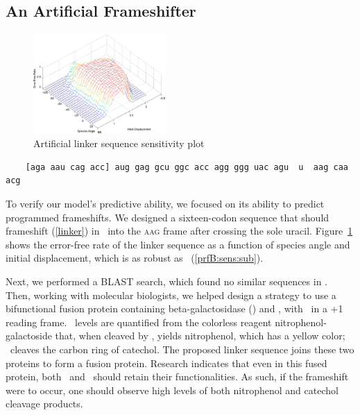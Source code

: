\documentclass[12pt]{article}
\begin{document}
\subsection{An Artificial Frameshifter}
\label{section:linker}
\begin{figure}
  \centering
  \caption{Artificial linker sequence sensitivity plot}
  \label{linker:sens}
  \includegraphics[width=0.45\textwidth]{linker/sensitivity}
\end{figure}

\begin{cfigure}
  \caption{Artificial linker sequence with a 12-base leader sequence
    in brackets}
  \label{linker}
  \begin{verbatim}
    [aga aau cag acc] aug gag gcu ggc acc agg ggg uac agu  u  aag caa acg
  \end{verbatim}
\end{cfigure}

To verify our model's predictive ability, we focused on its ability to
predict programmed frameshifts. We designed a sixteen-codon sequence
that should frameshift (\autoref{linker}) in \ecoli\ into
the \textsc{aag} frame after crossing the sole uracil.  Figure~\ref{linker:sens}
shows the error-free rate of the linker sequence as a function of species
angle and initial displacement, which is as robust as \prfB\ (\autoref{prfB:sens:sub}).

Next, we performed a BLAST search, which found no similar sequences in 
\ecoli. Then, working with molecular 
biologists, we helped design a strategy to use a bifunctional fusion 
protein containing beta-galactosidase (\bgals) and \xylE, with \xylE\ in 
a +1 reading frame. \bgals\ levels are quantified from the colorless 
reagent nitrophenol-galactoside that, when cleaved by \bgals, yields 
nitrophenol, which has a yellow color; \xylE\ cleaves the carbon ring 
of catechol.  The proposed linker sequence joins these two proteins 
to form a fusion protein.  Research indicates that even in this fused 
protein, both \bgals\ and \xylE\ should retain their functionalities.
As such, if the frameshift were to occur, one should observe high 
levels of both nitrophenol and catechol cleavage products.
\end{document}
